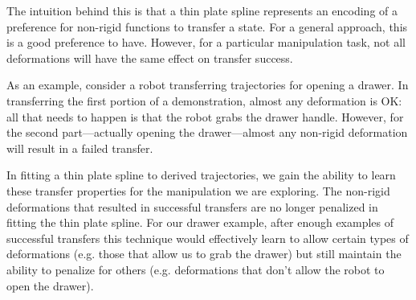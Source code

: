 The intuition behind this is that a thin plate spline represents an encoding of a preference
for non-rigid functions to transfer a state. For a general approach, this is a good
preference to have. However, for a particular manipulation task, not all deformations
will have the same effect on transfer success. 

As an example, consider a robot transferring
trajectories for opening a drawer. In transferring the first portion of a demonstration,
almost any deformation is OK: all that needs to happen is that the robot grabs the drawer handle.
However, for the second part---actually opening the drawer---almost any non-rigid deformation
will result in a failed transfer.

In fitting a thin plate spline to derived trajectories, we gain the ability 
to learn these transfer properties for the manipulation we are exploring.
The non-rigid deformations that resulted in successful transfers are no longer
penalized in fitting the thin plate spline. For our drawer example, after enough
examples of successful transfers this technique would effectively learn to allow
certain types of deformations (e.g. those that allow us to grab the drawer) but still
maintain the ability to penalize for others (e.g. deformations that don't allow the robot to
open the drawer).


